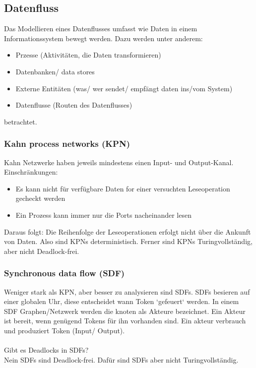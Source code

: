 \subsection{Datenfluss}

Das Modellieren eines Datenflusses umfasst wie Daten in einem Informationssystem bewegt werden.
Dazu werden unter anderem:
\begin{itemize}
    \item Przesse (Aktivitäten, die Daten transformieren)
    \item Datenbanken/ data stores
    \item Externe Entitäten (was/ wer sendet/ empfängt daten ins/vom System)
    \item Datenflusse (Routen des Datenflusses)
\end{itemize}
betrachtet.


\subsubsection{Kahn process networks (KPN)}

Kahn Netzwerke haben jeweils mindestens einen Input- und Output-Kanal.
Einschränkungen:
\begin{itemize}
    \item Es kann nicht für verfügbare Daten for einer versuchten Leseoperation gecheckt werden
    \item Ein Prozess kann immer nur die Ports nacheinander lesen
\end{itemize}
Daraus folgt:
Die Reihenfolge der Leseoperationen erfolgt nicht über die Ankunft von Daten. Also sind KPNs deterministisch.
Ferner sind KPNs Turingvollständig, aber nicht Deadlock-frei.

\subsubsection{Synchronous data flow (SDF)}

Weniger stark als KPN, aber besser zu analysieren sind SDFs.
SDFs besieren auf einer globalen Uhr, diese entscheidet wann Token `gefeuert` werden.
In einem SDF Graphen/Netzwerk werden die knoten als Akteure bezeichnet.
Ein Akteur ist bereit, wenn genügend Tokens für ihn vorhanden sind.
Ein akteur verbrauch und produziert Token (Input/ Output).
\\ \\
Gibt es Deadlocks in SDFs?\\
Nein SDFs sind Deadlock-frei.
Dafür sind SDFs aber nicht Turingvollständig.
